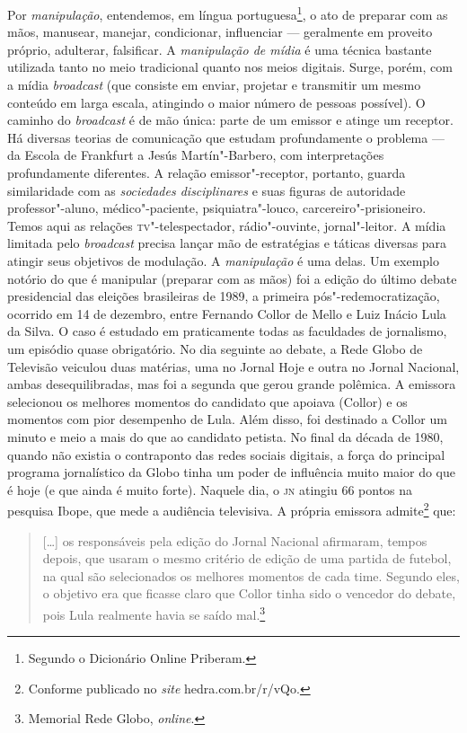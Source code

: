 Por \emph{manipulação}, entendemos, em língua portuguesa\footnote{Segundo o Dicionário Online Priberam.}, o
ato de preparar com as mãos, manusear, manejar, condicionar, influenciar
--- geralmente em proveito próprio, adulterar, falsificar. A
\emph{manipulação de mídia} é uma técnica bastante utilizada tanto no
meio tradicional quanto nos meios digitais. Surge, porém, com a mídia
\emph{broadcast} (que consiste em enviar, projetar e transmitir um mesmo
conteúdo em larga escala, atingindo o maior número de pessoas possível).
O caminho do \emph{broadcast} é de mão única: parte de um emissor e
atinge um receptor. Há diversas teorias de comunicação que estudam
profundamente o problema --- da Escola de Frankfurt a Jesús
Martín"-Barbero, com interpretações profundamente diferentes. A relação
emissor"-receptor, portanto, guarda similaridade com as \emph{sociedades
disciplinares} e suas figuras de autoridade professor"-aluno,
médico"-paciente, psiquiatra"-louco, carcereiro"-prisioneiro. Temos aqui as
relações \textsc{tv}"-telespectador, rádio"-ouvinte, jornal"-leitor. A mídia
limitada pelo \emph{broadcast} precisa lançar mão de estratégias e
táticas diversas para atingir seus objetivos de modulação. A
\emph{manipulação} é uma delas. Um exemplo notório do que é manipular
(preparar com as mãos) foi a edição do último debate presidencial das
eleições brasileiras de 1989, a primeira pós"-redemocratização, ocorrido
em 14 de dezembro, entre Fernando Collor de Mello e Luiz Inácio Lula da
Silva. O caso é estudado em praticamente todas as faculdades de
jornalismo, um episódio quase obrigatório. No dia seguinte ao debate, a
Rede Globo de Televisão veiculou duas matérias, uma no Jornal Hoje e
outra no Jornal Nacional, ambas desequilibradas, mas foi a segunda que
gerou grande polêmica. A emissora selecionou os melhores momentos do
candidato que apoiava (Collor) e os momentos com pior desempenho de Lula. 
Além disso, foi destinado a Collor um minuto e meio a mais do que ao
candidato petista. No final da década de 1980, quando não existia o
contraponto das redes sociais digitais, a força do principal programa
jornalístico da Globo tinha um poder de influência muito maior do que é
hoje (e que ainda é muito forte). Naquele dia, o \textsc{jn} atingiu 66 pontos na
pesquisa Ibope, que mede a audiência televisiva. A própria emissora admite\footnote{Conforme publicado no
\emph{site} hedra.com.br/r/vQo.} que:

\begin{quote}
{[}\ldots{}{]} os responsáveis pela edição do Jornal Nacional afirmaram, tempos
depois, que usaram o mesmo critério de edição de uma partida de futebol,
na qual são selecionados os melhores momentos de cada time. Segundo
eles, o objetivo era que ficasse claro que Collor tinha sido o vencedor
do debate, pois Lula realmente havia se saído mal.\footnote{Memorial Rede Globo,
\emph{online}.}
\end{quote}

